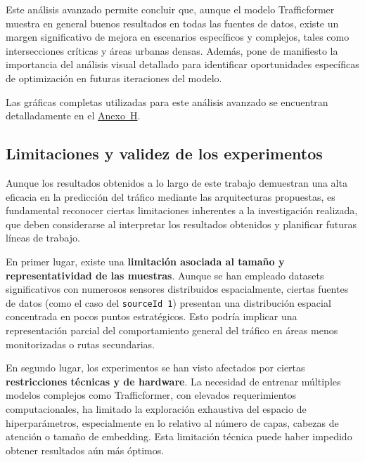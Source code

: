 Este análisis avanzado permite concluir que, aunque el modelo Trafficformer muestra en general buenos resultados en todas las fuentes de datos, existe un margen significativo de mejora en escenarios específicos y complejos, tales como intersecciones críticas y áreas urbanas densas. Además, pone de manifiesto la importancia del análisis visual detallado para identificar oportunidades específicas de optimización en futuras iteraciones del modelo.

Las gráficas completas utilizadas para este análisis avanzado se encuentran detalladamente en el \hyperref[anexo:analisis_avanzado]{Anexo~H}.


\subsection{Limitaciones y validez de los experimentos}
\label{sec:limitaciones_validez}

Aunque los resultados obtenidos a lo largo de este trabajo demuestran una alta eficacia en la predicción del tráfico mediante las arquitecturas propuestas, es fundamental reconocer ciertas limitaciones inherentes a la investigación realizada, que deben considerarse al interpretar los resultados obtenidos y planificar futuras líneas de trabajo.

En primer lugar, existe una \textbf{limitación asociada al tamaño y representatividad de las muestras}. Aunque se han empleado datasets significativos con numerosos sensores distribuidos espacialmente, ciertas fuentes de datos (como el caso del \texttt{sourceId 1}) presentan una distribución espacial concentrada en pocos puntos estratégicos. Esto podría implicar una representación parcial del comportamiento general del tráfico en áreas menos monitorizadas o rutas secundarias.

En segundo lugar, los experimentos se han visto afectados por ciertas \textbf{restricciones técnicas y de hardware}. La necesidad de entrenar múltiples modelos complejos como Trafficformer, con elevados requerimientos computacionales, ha limitado la exploración exhaustiva del espacio de hiperparámetros, especialmente en lo relativo al número de capas, cabezas de atención o tamaño de embedding. Esta limitación técnica puede haber impedido obtener resultados aún más óptimos.

